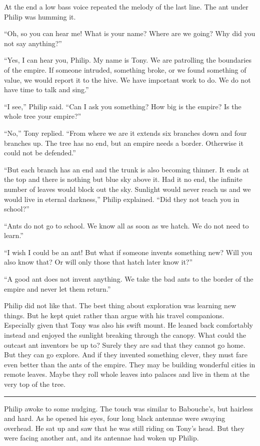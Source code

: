 \documentclass[10pt, draft]{memoir}
\renewcommand{\pfbreakdisplay}{\bigskip \ding{166} \bigskip}
\newcommand{\secbreak}{\fancybreak{\pfbreakdisplay}}
\begin{document}
At the end a low bass voice repeated the melody of the last line. The ant under
Philip was humming it.

``Oh, so you can hear me! What is your name? Where are we going? Why did you
not say anything?''

``Yes, I can hear you, Philip. My name is Tony. We are patrolling the
boundaries of the empire. If someone intruded, something broke, or we found
something of value, we would report it to the hive. We have important work to
do. We do not have time to talk and sing.''

``I see,'' Philip said. ``Can I ask you something? How big is the empire? Is
the whole tree your empire?''

``No,'' Tony replied. ``From where we are it extends six branches down and four
branches up. The tree has no end, but an empire needs a border. Otherwise it
could not be defended.''

``But each branch has an end and the trunk is also becoming thinner. It ends at
the top and there is nothing but blue sky above it. Had it no end, the infinite
number of leaves would block out the sky. Sunlight would never reach us and we
would live in eternal darkness,'' Philip explained. ``Did they not teach you in
school?''

``Ants do not go to school. We know all as soon as we hatch. We do not need to
learn.''

``I wish I could be an ant! But what if someone invents something new? Will you
also know that? Or will only those that hatch later know it?''

``A good ant does not invent anything. We take the bad ants to the border of
the empire and never let them return.''

Philip did not like that. The best thing about exploration was learning new
things. But he kept quiet rather than argue with his travel companions.
Especially given that Tony was also his swift mount. He leaned back comfortably
instead and enjoyed the sunlight breaking through the canopy. What could the
outcast ant inventors be up to? Surely they are sad that they cannot go home.
But they can go explore. And if they invented something clever, they must fare
even better than the ants of the empire. They may be building wonderful cities
in remote leaves. Maybe they roll whole leaves into palaces and live in them at
the very top of the tree.

\secbreak

Philip awoke to some nudging. The touch was similar to Babouche's, but hairless
and hard. As he opened his eyes, four long black antennae were swaying
overhead. He sat up and saw that he was still riding on Tony's head. But they
were facing another ant, and its antennae had woken up Philip.
\end{document}
